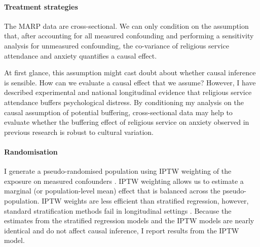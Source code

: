 \documentclass[]{interact}
\theoremstyle{plain}%
\theoremstyle{definition}
\theoremstyle{remark}
\begin{document}
\begin{table}[h!bt]
\caption{Cross tabulation of religious service attendance frequency and religious identification}
\label{tab:table1}
\end{table}

\paragraph*{Treatment strategies} The MARP data are cross-sectional. We can only condition on the assumption that, after accounting for all measured confounding and performing a sensitivity analysis for unmeasured confounding, the co-variance of religious service attendance and anxiety quantifies a causal effect. 

At first glance, this assumption might cast doubt about whether causal inference is sensible. How can we evaluate a causal effect that we assume? However, I have described experimental and national longitudinal evidence that religious service attendance buffers psychological distress. By conditioning my analysis on the causal assumption of potential buffering, cross-sectional data may help to evaluate whether the buffering effect of religious service on anxiety observed in previous research is robust to cultural variation.

\paragraph*{Randomisation} I generate a pseudo-randomised population using IPTW weighting of the exposure on measured confounders \citep{cole_constructing_2008,wal_ipw_2011}. 
IPTW weighting allows us to estimate a marginal (or population-level mean) effect that is balanced across the pseudo-population. IPTW weights are less efficient than stratified regression, however, standard stratification methods fail in longitudinal settings \citep{robins_new_1986}. 
Because the estimates from the stratified regression models and the IPTW  models are nearly identical and do not affect causal inference, I report results from the IPTW model. 
\end{document}
